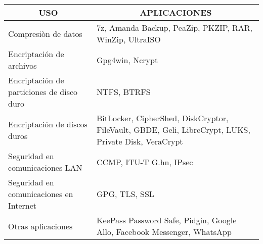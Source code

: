 \begin{tabular}{|p{6cm}|p{8cm}|}
  \hline
  \multicolumn{1}{|c|}{\textbf{USO}} & \multicolumn{1}{c|}{\textbf{APLICACIONES}}       \\ \hline
  Compresiòn de datos & 7z, Amanda Backup, PeaZip, PKZIP, RAR, WinZip, UltraISO 
  \\ \hline
  Encriptación de archivos & Gpg4win, Ncrypt
  \\ \hline
  Encriptación de particiones de disco duro & NTFS, BTRFS
  \\ \hline
  Encriptación de discos duros & BitLocker, CipherShed, DiskCryptor, FileVault, GBDE, Geli, LibreCrypt, LUKS, Private Disk, VeraCrypt
  \\ \hline
  Seguridad en comunicaciones LAN & CCMP, ITU-T G.hn, IPsec
  \\ \hline
  Seguridad en comunicaciones en Internet & GPG, TLS, SSL
  \\ \hline
  Otras aplicaciones & KeePass Password Safe, Pidgin, Google Allo, Facebook Messenger, WhatsApp
  \\ \hline
\end{tabular}